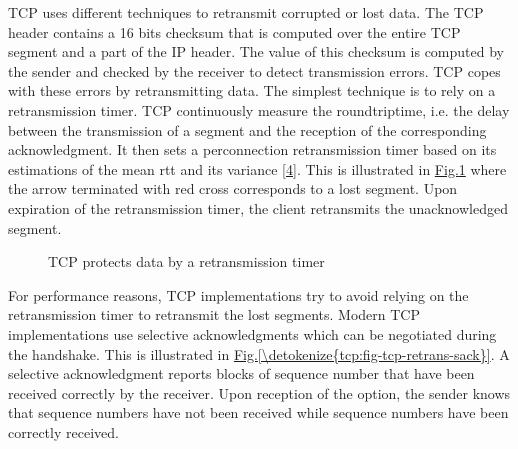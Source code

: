 \documentclass[letterpaper,10pt,english]{sphinxmanual}
\begin{document}
\sphinxAtStartPar
TCP uses different techniques to retransmit corrupted or lost data. The TCP header contains a 16 bits checksum that is computed over the entire TCP segment and a part of the IP header. The value of this checksum is computed by the sender and checked by the receiver to detect transmission errors. TCP copes with these errors by retransmitting data. The simplest technique is to rely on a retransmission timer. TCP continuously measure the round\sphinxhyphen{}trip\sphinxhyphen{}time, i.e. the delay between the transmission of a segment and the reception of the corresponding acknowledgment. It then sets a per\sphinxhyphen{}connection retransmission timer based on its estimations of the mean rtt and its variance {[}\hyperlink{cite.biblio:id6147}{4}{]}. This is illustrated in \hyperref[\detokenize{tcp:fig-tcp-retrans}]{Fig.\@ \ref{\detokenize{tcp:fig-tcp-retrans}}} where the arrow terminated with red cross corresponds to a lost segment. Upon expiration of the retransmission timer, the client retransmits the unacknowledged segment.
\begin{figure}[htbp]\centering\capstart{}\caption{TCP protects data by a retransmission timer}\label{\detokenize{tcp:id10}}\label{\detokenize{tcp:fig-tcp-retrans}}\end{figure}
\sphinxAtStartPar
For performance reasons, TCP implementations try to avoid relying on the retransmission timer to retransmit the lost segments. Modern TCP implementations use selective acknowledgments which can be negotiated during the handshake. This is illustrated in \hyperref[\detokenize{tcp:fig-tcp-retrans-sack}]{Fig.\@ \ref{\detokenize{tcp:fig-tcp-retrans-sack}}}. A selective acknowledgment reports blocks of sequence number that have been received correctly by the receiver. Upon reception of the  option, the sender knows that sequence numbers  have not been received while sequence numbers  have been correctly received.
\end{document}
